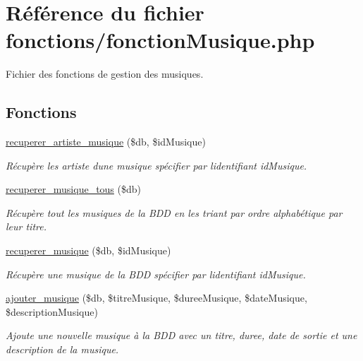 \hypertarget{fonctionMusique_8php}{}\section{Référence du fichier fonctions/fonction\+Musique.php}
\label{fonctionMusique_8php}


Fichier des fonctions de gestion des musiques.  


\subsection*{Fonctions}
\begin{DoxyCompactItemize}
\item 
\hyperlink{fonctionMusique_8php_a74ec8e1eb7cda5a5b26e0384019d0c7f}{recuperer\+\_\+artiste\+\_\+musique} (\$db, \$id\+Musique)
\begin{DoxyCompactList}\small\item\em Récupère les artiste d\textquotesingle{}une musique spécifier par l\textquotesingle{}identifiant \textquotesingle{}id\+Musique\textquotesingle{}. \end{DoxyCompactList}\item 
\hyperlink{fonctionMusique_8php_af330ba4aeb1ac679ae0b8227be73e927}{recuperer\+\_\+musique\+\_\+tous} (\$db)
\begin{DoxyCompactList}\small\item\em Récupère tout les musiques de la B\+DD en les triant par ordre alphabétique par leur titre. \end{DoxyCompactList}\item 
\hyperlink{fonctionMusique_8php_abde3ba80f1b39503056076dd0db4cca5}{recuperer\+\_\+musique} (\$db, \$id\+Musique)
\begin{DoxyCompactList}\small\item\em Récupère une musique de la B\+DD spécifier par l\textquotesingle{}identifiant \textquotesingle{}id\+Musique\textquotesingle{}. \end{DoxyCompactList}\item 
\hyperlink{fonctionMusique_8php_a7ca7a2721c0ce1460fbfce47541cc830}{ajouter\+\_\+musique} (\$db, \$titre\+Musique, \$duree\+Musique, \$date\+Musique, \$description\+Musique)
\begin{DoxyCompactList}\small\item\em Ajoute une nouvelle musique à la B\+DD avec un titre, duree, date de sortie et une description de la musique. \end{DoxyCompactList}\item 

\end{DoxyCompactItemize}
